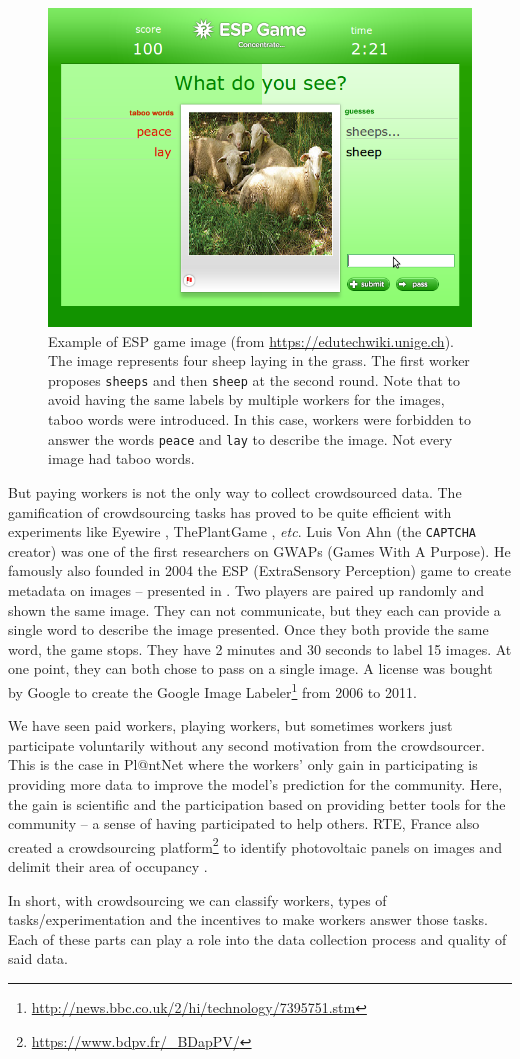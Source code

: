 \begin{figure}[ht]
        \centering
        \includegraphics[width=.6\textwidth]{chapters/images/ESP.png}
        \caption{Example of ESP game image (from \url{https://edutechwiki.unige.ch}). The image represents four sheep laying in the grass. The first worker proposes \texttt{sheeps} and then \texttt{sheep} at the second round. Note that to avoid having the same labels by multiple workers for the images, taboo words were introduced. In this case, workers were forbidden to answer the words \texttt{peace} and \texttt{lay} to describe the image. Not every image had taboo words.}
        \label{fig:ESP-game}
\end{figure}

But paying workers is not the only way to collect crowdsourced data.
The gamification of crowdsourcing tasks has proved to be quite efficient with experiments like Eyewire \citep{tinati2017investigation}, ThePlantGame \citep{plantgame2016}, \emph{etc}.
Luis Von Ahn (the \texttt{CAPTCHA} creator) was one of the first researchers on GWAPs (Games With A Purpose).
He famously also founded in 2004 the ESP (ExtraSensory Perception) game \citep{von2005esp} to create metadata on images --  presented in . 
Two players are paired up randomly and shown the same image.
They can not communicate, but they each can provide a single word to describe the image presented.
Once they both provide the same word, the game stops.
They have 2 minutes and 30 seconds to label 15 images.
At one point, they can both chose to pass on a single image.
A license was bought by Google to create the Google Image Labeler\footnote{\url{http://news.bbc.co.uk/2/hi/technology/7395751.stm}} from 2006 to 2011.

We have seen paid workers, playing workers, but sometimes workers just participate voluntarily without any second motivation from the crowdsourcer.
This is the case in Pl@ntNet where the workers' only gain in participating is providing more data to improve the model's prediction for the community. Here, the gain is scientific and the participation based on providing better tools for the community -- a sense of having participated to help others.
RTE, France also created a crowdsourcing platform\footnote{\url{https://www.bdpv.fr/_BDapPV/}} to identify photovoltaic panels on images and delimit their area of occupancy \citep{kasmi2023crowdsourced}.   

In short, with crowdsourcing we can classify workers, types of tasks/experimentation and the incentives to make workers answer those tasks. Each of these parts can play a role into the data collection process and quality of said data.
